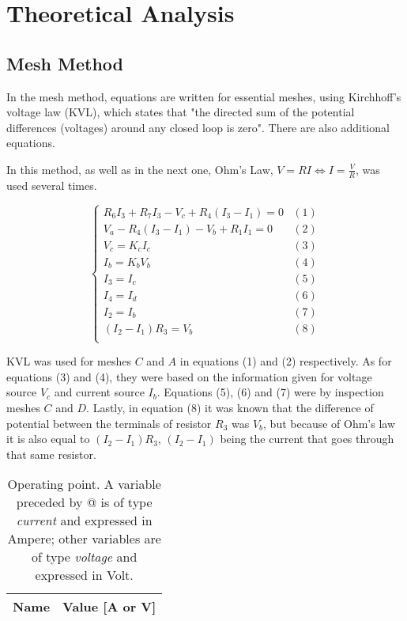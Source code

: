 \section{Theoretical Analysis}
\label{sec:analysis}
\subsection{Mesh Method}
\par
In the mesh method, equations are written for essential meshes, using Kirchhoff's voltage law (KVL), which states that "the directed sum of the potential differences (voltages) around any closed loop is zero". There are also additional equations.

\par
In this method, as well as in the next one, Ohm's Law, $V=RI \Leftrightarrow I = \frac{V}{R}$, was used several times.


\begin{equation}
\begin{cases}
R_6 I_3 + R_7 I_3 - V_c + R_4(I_3-I_1) = 0 & \mbox{$(1)$}\\
V_a - R_4 (I_3-I_1) - V_b + R_1 I_1 = 0 & \mbox{$(2)$}\\
V_c = K_c I_c & \mbox{$(3)$} \\
I_b = K_b V_b & \mbox{$(4)$} \\
I_3 = I_c & \mbox{$(5)$}\\
I_4 = I_d & \mbox{$(6)$}\\
I_2 = I_b & \mbox{$(7)$}\\
(I_2-I_1) R_3 = V_b & \mbox{$(8)$}\\
\end{cases}
\end{equation}

\par
KVL was used for meshes $C$ and $A$ in equations (1) and (2) respectively. As for equations (3) and (4), they were based on the information given for voltage source $V_c$ and current source $I_b$. Equations (5), (6) and (7) were by inspection meshes $C$ and $D$. Lastly, in equation (8) it was known that the difference of potential between the terminals of resistor $R_3$ was $V_b$, but because of Ohm's law it is also equal to $(I_2-I_1) R_3$, $(I_2-I_1)$ being the current that goes through that same resistor.

\begin{table}[hbt!]
  \centering
  \begin{tabular}{|c|c|}
    \hline    
    {\bf Name} & {\bf Value [A or V]} \\ \hline
    
  \end{tabular}
  \caption{Operating point. A variable preceded by @ is of type {\em current}
    and expressed in Ampere; other variables are of type {\it voltage} and expressed in
    Volt.}
  \label{tab:op}
\end{table}

